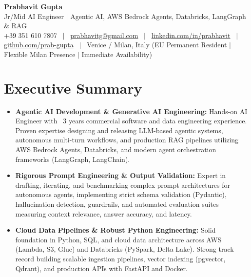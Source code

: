 \documentclass[a4paper,10pt]{article}
\begin{document}
\begin{minipage}[c]{0.80\textwidth}
  {\Huge\bfseries Prabhavit Gupta}\\[3pt]
  {\color{accent}\large Jr/Mid AI Engineer $\vert$ Agentic AI, AWS Bedrock Agents, Databricks, LangGraph $\&$ RAG}\\[6pt]
  {\footnotesize +39 351 610 7807 ~$\vert$~
  \href{mailto:prabhavitg@gmail.com}{prabhavitg@gmail.com} ~$\vert$~
  \href{https://www.linkedin.com/in/prabhavit/}{linkedin.com/in/prabhavit} ~$\vert$~
  \href{https://github.com/prab-gupta}{github.com/prab-gupta} ~$\vert$~
  Venice / Milan, Italy (EU Permanent Resident $\vert$ Flexible Milan Presence $\vert$ Immediate Availability)}
\end{minipage}\hfill

\vspace{6pt}

\section{Executive Summary}
\begin{itemize}
  \item \textbf{Agentic AI Development \& Generative AI Engineering:} Hands-on AI Engineer with ~3 years commercial software and data engineering experience. Proven expertise designing and releasing LLM-based agentic systems, autonomous multi-turn workflows, and production RAG pipelines utilizing AWS Bedrock Agents, Databricks, and modern agent orchestration frameworks (LangGraph, LangChain).
  \item \textbf{Rigorous Prompt Engineering \& Output Validation:} Expert in drafting, iterating, and benchmarking complex prompt architectures for autonomous agents, implementing strict schema validation (Pydantic), hallucination detection, guardrails, and automated evaluation suites measuring context relevance, answer accuracy, and latency.
  \item \textbf{Cloud Data Pipelines \& Robust Python Engineering:} Solid foundation in Python, SQL, and cloud data architecture across AWS (Lambda, S3, Glue) and Databricks (PySpark, Delta Lake). Strong track record building scalable ingestion pipelines, vector indexing (pgvector, Qdrant), and production APIs with FastAPI and Docker.
\end{itemize}

\end{document}
